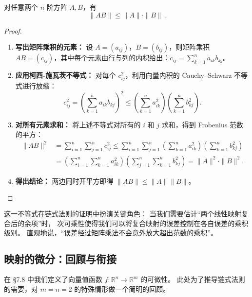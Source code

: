 \documentclass[lang=cn,11pt]{elegantbook}
\begin{document}
\begin{property}[矩阵范数的次可乘性] \label{prop:norm-submultiplicative}
对任意两个 $n$ 阶方阵 $A,B$，有
\[
\boxed{\;\|AB\|\leq\|A\|\cdot\|B\|\;}.
\]
\end{property}

\begin{proof}
\begin{enumerate}
  \item \textbf{写出矩阵乘积的元素：} 
  设 $A=(a_{ij})$，$B=(b_{ij})$，则矩阵乘积 $AB=(c_{ij})$，其中每个元素由行与列的内积给出：$c_{ij}=\sum_{k=1}^{n}a_{ik}b_{kj}$。
  
  \item \textbf{应用柯西-施瓦茨不等式：} 
  对每个 $c_{ij}^2$，利用向量内积的 Cauchy--Schwarz 不等式进行放缩：
  \[
  c_{ij}^2=\left(\sum_{k=1}^{n}a_{ik}b_{kj}\right)^{\!2}
  \leq\left(\sum_{k=1}^{n}a_{ik}^2\right)\!\left(\sum_{k=1}^{n}b_{kj}^2\right).
  \]
  
  \item \textbf{对所有元素求和：} 
  将上述不等式对所有的 $i$ 和 $j$ 求和，得到 Frobenius 范数的平方：
  \begin{align*}
  \|AB\|^2
  &=\sum_{i=1}^{n}\sum_{j=1}^{n}c_{ij}^2\leq\sum_{i=1}^{n}\sum_{j=1}^{n}
    \left(\sum_{k=1}^{n}a_{ik}^2\right)\!\left(\sum_{k=1}^{n}b_{kj}^2\right)\\
  &=\left(\sum_{i=1}^{n}\sum_{k=1}^{n}a_{ik}^2\right)\!
    \left(\sum_{j=1}^{n}\sum_{k=1}^{n}b_{kj}^2\right)=\|A\|^2\cdot\|B\|^2.
  \end{align*}
  
  \item \textbf{得出结论：} 
  两边同时开平方即得 $\|AB\|\leq\|A\|\|B\|$。
\end{enumerate}
\end{proof}

\begin{remark}[次可乘性的意义]
这一不等式在链式法则的证明中扮演关键角色：
当我们需要估计“两个线性映射复合后的余项”时，
次可乘性使得我们可以将复合映射的误差控制在各自误差的乘积级别。
直观地说，“误差经过矩阵乘法不会意外放大超出范数的乘积”。
\end{remark}


\subsection{映射的微分：回顾与衔接}

在 §7.8 中我们定义了向量值函数 $f:\mathbb R^n\to\mathbb R^m$ 的可微性。
此处为了推导链式法则的需要，对 $m=n=2$ 的特殊情形做一个简明的回顾。
\end{document}
